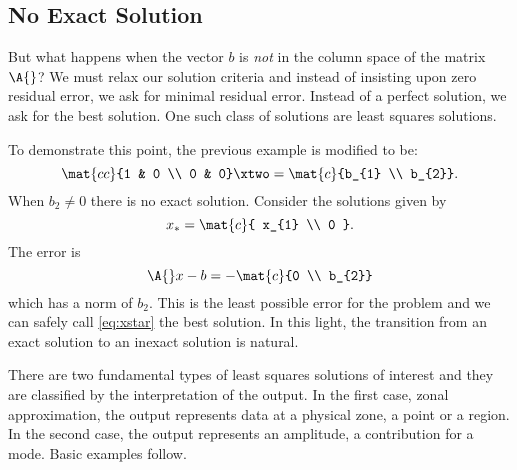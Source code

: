 \subsection{\label{ssec:no exact soln}No Exact Solution}  %
But what happens when the vector $b$ is \emph{not} in the column space of the matrix $\A{}$? We must relax our solution criteria and instead of insisting upon zero residual error, we ask for minimal residual error. Instead of a perfect solution, we ask for the best solution. One such class of solutions are least squares solutions.

To demonstrate this point, the previous example is modified to be:
  \begin{equation*}   %
      \mat{cc}{1 & 0 \\ 0 & 0} \xtwo = \mat{c}{b_{1} \\ b_{2}} .
  \end{equation*}
When $b_{2} \ne 0$ there is no exact solution. Consider the solutions given by
  \begin{equation}   %
      x_{*} = \mat{c}{ x_{1} \\ 0 } .
      \label{eq:xstar}
  \end{equation}
The error is 
  \begin{equation*}   %
      \A{} x - b = -\mat{c}{0 \\ b_{2}}
  \end{equation*}
which has a norm of $b_{2}$. This is the least possible error for the problem and we can safely call \eqref{eq:xstar} the best solution. In this light, the transition from an exact solution to an inexact solution is natural.

There are two fundamental types of least squares solutions of interest and they are classified by the interpretation of the output. In the first case, zonal approximation, the output represents data at a physical zone, a point or a region. In the second case, the output represents an amplitude, a contribution for a mode. Basic examples follow.

